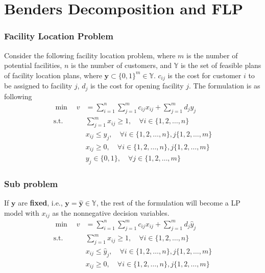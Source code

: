 \documentclass[10pt]{beamer}
\begin{document}
	\section{Benders Decomposition and FLP}
	\begin{frame}
		\frametitle{Facility Location Problem}
		Consider the following facility location problem, where $m$ is the number of potential facilities, $n$ is the number of customers, and $\mathbb{Y}$ is the set of feasible plans of facility location plans, where $\mathbf{y} \subset \{0, 1\}^m \in \mathbb{Y}$. $c_{ij}$ is the cost for customer $i$ to be assigned to facility $j$, $d_j$ is the cost for opening facility $j$. The formulation is as following
		\begin{align*}
			\min \quad v& = \sum_{i = 1}^n \sum_{j = 1}^m c_{ij} x_{ij} + \sum_{j = 1}^m d_j y_j\\
			\text{s.t.} \quad & \sum_{j = 1}^m x_{ij} \ge 1, \quad \forall i \in \{1, 2, \ldots, n\}\\
				& x_{ij} \le y_j, \quad \forall i \in \{1, 2, \ldots, n\}, j \{1, 2, \ldots, m\}\\
				& x_{ij} \ge 0, \quad \forall i \in \{1, 2, \ldots, n\}, j \{1, 2, \ldots, m\}\\
				& y_{j} \in \{0, 1\}, \quad \forall j \in \{1, 2, \ldots, m\}
		\end{align*}
	\end{frame}

	\begin{frame}
		\frametitle{Sub problem}
		If $\mathbf{y}$ are \textbf{fixed}, i.e., $\mathbf{y} = \hat{\mathbf{y}} \in \mathbb{Y}$, the rest of the formulation will become a LP model with $x_{ij}$ as the nonnegative decision variables.
		\begin{align*}
			\min \quad v& = \sum_{i = 1}^n \sum_{j = 1}^m c_{ij} x_{ij} + \sum_{j = 1}^m d_j \hat{y}_j\\
			\text{s.t.} \quad & \sum_{j = 1}^m x_{ij} \ge 1, \quad \forall i \in \{1, 2, \ldots, n\}\\
				& x_{ij} \le \hat{y}_j, \quad \forall i \in \{1, 2, \ldots, n\}, j \{1, 2, \ldots, m\}\\
				& x_{ij} \ge 0, \quad \forall i \in \{1, 2, \ldots, n\}, j \{1, 2, \ldots, m\}\\
		\end{align*}
	\end{frame}
\end{document}
